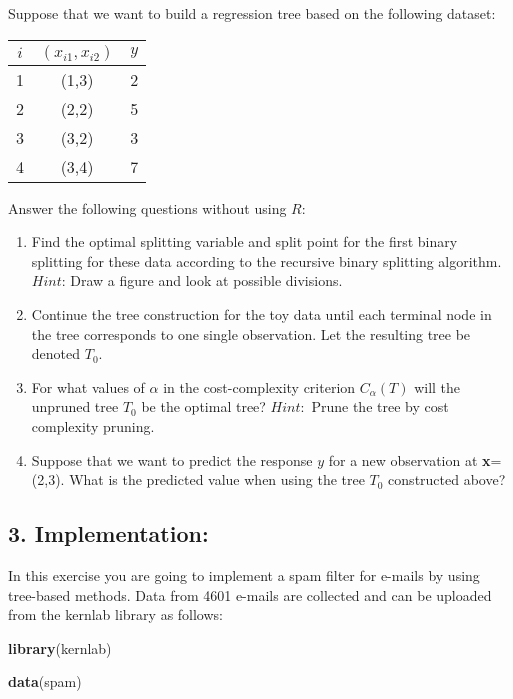 \documentclass[]{article}
\newenvironment{Shaded}{\begin{snugshade}}{\end{snugshade}}
\newcommand{\KeywordTok}[1]{\textcolor[rgb]{0.13,0.29,0.53}{\textbf{#1}}}
\newcommand{\NormalTok}[1]{#1}
\begin{document}
Suppose that we want to build a regression tree based on the following
dataset:

\begin{longtable}[]{@{}ccc@{}}
\toprule
\(i\) & \((x_{i1},x_{i2})\) & \(y\)\tabularnewline
\midrule
\endhead
1 & (1,3) & 2\tabularnewline
2 & (2,2) & 5\tabularnewline
3 & (3,2) & 3\tabularnewline
4 & (3,4) & 7\tabularnewline
\bottomrule
\end{longtable}

Answer the following questions without using \(R\):

\begin{enumerate}
\def\labelenumi{\alph{enumi})}
\setcounter{enumi}{2}
\item
  Find the optimal splitting variable and split point for the first
  binary splitting for these data according to the recursive binary
  splitting algorithm. \(Hint\): Draw a figure and look at possible
  divisions.
\item
  Continue the tree construction for the toy data until each terminal
  node in the tree corresponds to one single observation. Let the
  resulting tree be denoted \(T_0\).
\item
  For what values of \(\alpha\) in the cost-complexity criterion
  \(C_{\alpha}(T)\) will the unpruned tree \(T_0\) be the optimal tree?
  \(Hint:\) Prune the tree by cost complexity pruning.
\item
  Suppose that we want to predict the response \(y\) for a new
  observation at \textbf{x}=(2,3). What is the predicted value when
  using the tree \(T_0\) constructed above?
\end{enumerate}

\subsection{3. Implementation:}\label{implementation}

In this exercise you are going to implement a spam filter for e-mails by
using tree-based methods. Data from 4601 e-mails are collected and can
be uploaded from the kernlab library as follows:

\begin{Shaded}
\begin{Highlighting}[]
\KeywordTok{library}\NormalTok{(kernlab)}

\KeywordTok{data}\NormalTok{(spam)}
\end{Highlighting}
\end{Shaded}
\end{document}
